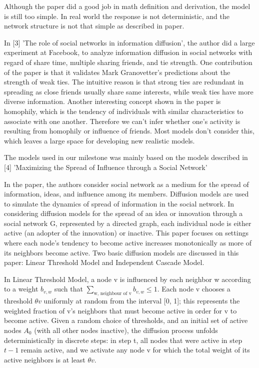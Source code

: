 \documentclass{article}
\begin{document}
Although the paper did a good job in math definition and derivation, the model is still too simple. In real world the response is not deterministic, and the network structure is not that simple as described in paper.

In [3] 'The role of social networks in information diffusion', the author did a large experiment at Facebook, to analyze information diffusion in social networks with regard of share time, multiple sharing friends, and tie strength. One contribution of the paper is that it validates Mark Granovetter's predictions about the strength of weak ties. The intuitive reason is that strong ties are redundant in spreading as close friends usually share same interests, while weak ties have more diverse information. Another interesting concept shown in the paper is homophily, which is the tendency of individuals with similar characteristics to associate with one another. Therefore we can't infer whether one's activity is resulting from homophily or influence of friends. Most models don't consider this, which leaves a large space for developing new realistic models. 

The models used in our milestone was mainly based on the models described in [4] 'Maximizing the Spread of Influence through a Social Network'

In the paper, the authors consider social network as a medium for the spread of information, ideas, and influence among its members. Diffusion models are used to simulate the dynamics of spread of information in the social network. In considering diffusion models for the spread of an idea or innovation through a social network G, represented by a directed graph, each individual node is either active (an adopter of the innovation) or inactive. This paper focuses on settings where each node’s tendency to become active increases monotonically as more of its neighbors become active. Two basic diffusion models are discussed in this paper: Linear Threshold Model and Independent Cascade Model.

In Linear Threshold Model, a node v is influenced by each neighbor w according to a weight $b_{v,w}$ such that $\sum_{\text{w, neighbour of v}}b_{v, w} \le 1$. Each node v chooses a threshold $\theta v$ uniformly at random from the interval [0, 1]; this represents the weighted fraction of v's neighbors that must become active in order for v to become active. Given a random choice of thresholds, and an initial set of active nodes $A_0$ (with all other nodes inactive), the diffusion process unfolds deterministically in discrete steps: in step t, all nodes that were active in step $t-1$ remain active, and we activate any node v for which the total weight of its active neighbors is at least $\theta v$.
\end{document}
